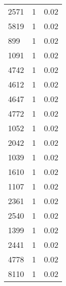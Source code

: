\begin{table*}[htbp]
\begin{tabular}{lrr}
2571 & 1 & 0.02 \\
5819 & 1 & 0.02 \\
899 & 1 & 0.02 \\
1091 & 1 & 0.02 \\
4742 & 1 & 0.02 \\
4612 & 1 & 0.02 \\
4647 & 1 & 0.02 \\
4772 & 1 & 0.02 \\
1052 & 1 & 0.02 \\
2042 & 1 & 0.02 \\
1039 & 1 & 0.02 \\
1610 & 1 & 0.02 \\
1107 & 1 & 0.02 \\
2361 & 1 & 0.02 \\
2540 & 1 & 0.02 \\
1399 & 1 & 0.02 \\
2441 & 1 & 0.02 \\
4778 & 1 & 0.02 \\
8110 & 1 & 0.02 \\
\bottomrule
\end{tabular}
\end{table*}
